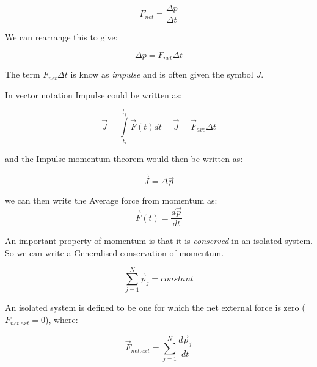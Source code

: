 \documentclass[12pt, letterpaper, twoside]{article}
\begin{document}
\begin{equation}
F_{net} = \frac {\Delta p}{\Delta t}
\end{equation}

\bigskip

We can rearrange this to give:

\begin{equation}
\Delta p = F_{net}{\Delta t}
\end{equation}

\bigskip
The term $F_{net}{\Delta t}$ is know as \emph{impulse} and is often given the symbol $J$.  


\bigskip

In vector notation Impulse could be written as:

\begin{equation}
\overrightarrow{J} = \int\limits_{t_i}^{t_f} \overrightarrow{F}(t) dt  = \overrightarrow{J} = \overrightarrow{F}_{ave} \Delta t 
\end{equation}

\bigskip

and the Impulse-momentum theorem would then be written as:

\begin{equation}
\overrightarrow{J} = \Delta \overrightarrow{p}
\end{equation}
 \bigskip
 
we can then write the Average force from momentum as:
\begin{equation}
\overrightarrow{F} (t) = \frac{d \overrightarrow{p}}{dt}
\end{equation}

\bigskip

An important property of momentum is that it is \emph{conserved} in an isolated system.  So we can write a Generalised conservation of momentum.

\begin{equation}
\displaystyle\sum_{j=1}^{N} \overrightarrow{p}_j = constant
\end{equation}

\bigskip

An isolated system is defined to be one for which the net external force is zero  ($F_{net.ext}=0$), where:

\begin{equation}
\overrightarrow{F}_{net.ext} = \displaystyle\sum_{j=1}^{N} \frac{d \overrightarrow{p}_j}{dt}
\end{equation}


\bigskip
\end{document}
